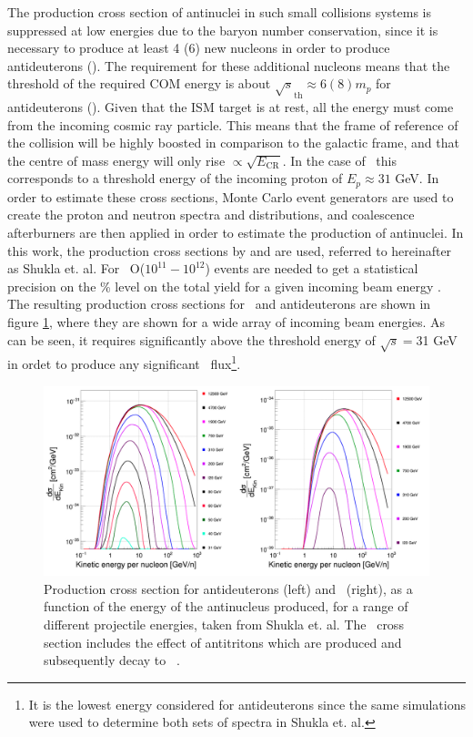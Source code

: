 The production cross section of antinuclei in such small collisions systems is suppressed at low energies due to the baryon number conservation, since it is necessary to produce at least 4 (6) new nucleons in order to produce antideuterons (\ahe). The requirement for these additional nucleons means that the threshold of the required COM energy is about $\sqrt{s}_{\mathrm{th}}\approx 6 (8)  m_p$ for antideuterons (\ahe ). Given that the ISM target is at rest, all the energy must come from the incoming cosmic ray particle. This means that the frame of reference of the collision will be highly boosted in comparison to the galactic frame, and that the centre of mass energy will only rise $\propto \sqrt{E_\mathrm{CR}}$. 
In the case of \ahe\ this corresponds to a threshold energy of the incoming proton of $E_p \approx 31$ GeV. In order to estimate these cross sections, Monte Carlo event generators are used to create the proton and neutron spectra and distributions, and coalescence afterburners are then applied in order to estimate the production of antinuclei. In this work, the production cross sections by \cite{Shukla} and \cite{Gomez} are used, referred to hereinafter as Shukla et. al. For \ahe\, O($10^{11}-10^{12}$) events are needed to get a statistical precision on the \% level on the total yield for a given incoming beam energy \cite{Shukla}. The resulting production cross sections for \ahe\ and antideuterons are shown in figure \ref{fig:CR_production_XS}, where they are shown for a wide array of incoming beam energies. As can be seen, it requires significantly above the threshold energy of $\sqrt{s}=$31 GeV in ordet to produce any significant \ahe\ flux\footnote{It is the lowest energy considered for antideuterons since the same simulations were used to determine both sets of spectra in Shukla et. al.}.

\begin{figure}
    \centering
    \includegraphics[width=\textwidth]{figures/production_xs_shukla.png}
    \caption{Production cross section for antideuterons (left) and \ahe\ (right), as a function of the energy of the antinucleus produced, for a range of different projectile energies, taken from Shukla et. al. The \ahe\ cross section includes the effect of antitritons which are produced and subsequently decay to \ahe\ . }
    \label{fig:CR_production_XS}
\end{figure}

